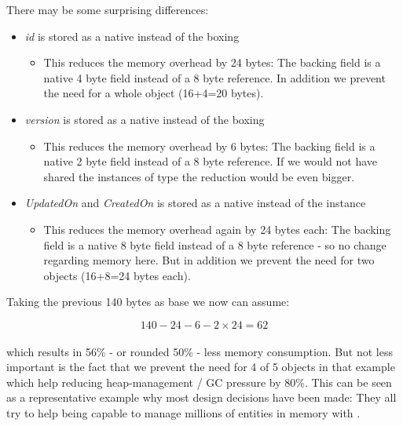 There may be some surprising differences:
\begin{itemize}
	\item \emph{id} is stored as a native  instead of the boxing 
		\begin{itemize}
			\item This reduces the memory overhead by 24 bytes: The backing field is a native 4 byte field instead of a 8 byte reference. In addition we prevent the need for a whole  object (16+4=20 bytes).
		\end{itemize}
	\item \emph{version} is stored as a native  instead of the boxing 
		\begin{itemize}
			\item This reduces the memory overhead by 6 bytes: The backing field is a native 2 byte field instead of a 8 byte reference. If we would not have shared the instances of type  the reduction would be even bigger.
		\end{itemize}
	\item \emph{UpdatedOn} and \emph{CreatedOn} is stored as a native  instead of the  instance
		\begin{itemize}
			\item This reduces the memory overhead again by 24 bytes each: The backing field is a native 8 byte field instead of a 8 byte reference - so no change regarding memory here. But in addition we prevent the need for two  objects (16+8=24 bytes each).
		\end{itemize}
\end{itemize}

Taking the previous 140 bytes as base we now can assume:

\[140-24-6-2\times24=62\]\\
which results in 56\% - or rounded 50\% - less memory consumption. But not less important is the fact that we prevent the need for 4 of 5 objects in that example which help reducing heap-management / GC pressure by 80\%. This can be seen as a representative example why most design decisions have been made: They all try to help being capable to manage millions of entities in memory with \AMBETH.